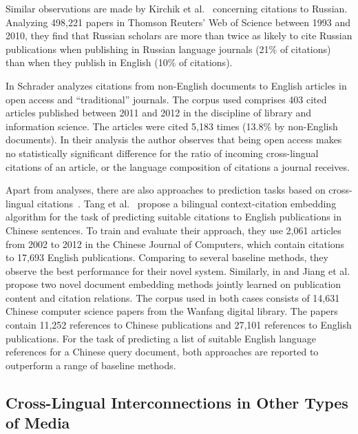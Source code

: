 Similar observations are made by Kirchik et al.~\cite{Kirchik2012} concerning citations to Russian. Analyzing 498,221 papers in Thomson Reuters' Web of Science between 1993 and 2010, they find that Russian scholars are more than twice as likely to cite Russian publications when publishing in Russian language journals (21\% of citations) than when they publish in English (10\% of citations).

In \cite{Schrader2019} Schrader analyzes citations from non-English documents to English articles in open access and ``traditional'' journals. The corpus used comprises 403 cited articles published between 2011 and 2012 in the discipline of library and information science. The articles were cited 5,183 times (13.8\% by non-English documents). In their analysis the author observes that being open access makes no statistically significant difference for the ratio of incoming cross-lingual citations of an article, or the language composition of citations a journal receives.

Apart from analyses, there are also approaches to prediction tasks based on cross-lingual citations~\cite{Tang2014,Jiang2018,Jiang2018b,Ma2020}. Tang et al.~\cite{Tang2014} propose a bilingual context-citation embedding algorithm for the task of predicting suitable citations to English publications in Chinese sentences. To train and evaluate their approach, they use 2,061 articles from 2002 to 2012 in the Chinese Journal of Computers, which contain citations to 17,693 English publications. Comparing to several baseline methods, they observe the best performance for their novel system. Similarly, in \cite{Jiang2018} and \cite{Jiang2018b} Jiang et al. propose two novel document embedding methods jointly learned on publication content and citation relations. The corpus used in both cases consists of 14,631 Chinese computer science papers from the Wanfang digital library. The papers contain 11,252 references to Chinese publications and 27,101 references to English publications. For the task of predicting a list of suitable English language references for a Chinese query document, both approaches are reported to outperform a range of baseline methods.

\subsection{Cross-Lingual Interconnections in Other Types of Media}

